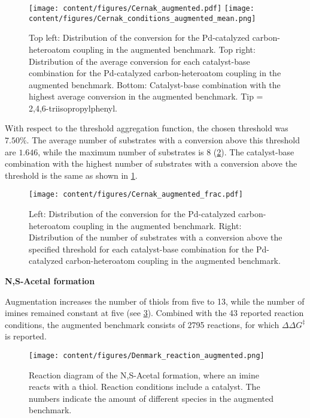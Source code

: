 \begin{figure}[h]
    \centering
    \texttt{[image: content/figures/Cernak\_augmented.pdf]}
    \texttt{[image: content/figures/Cernak\_conditions\_augmented\_mean.png]}
    \caption{Top left: Distribution of the conversion for the Pd-catalyzed carbon-heteroatom coupling in the augmented benchmark. Top right: Distribution of the average conversion for each catalyst-base combination for the Pd-catalyzed carbon-heteroatom coupling in the augmented benchmark. Bottom: Catalyst-base combination with the highest average conversion in the augmented benchmark. Tip = 2,4,6-triisopropylphenyl.}
    \label{fig:Cernak_EDA_augmented}
\end{figure}

With respect to the threshold aggregation function, the chosen threshold was $7.50\%$.
The average number of substrates with a conversion above this threshold are $1.646$, while the maximum number of substrates is $8$ (\cref{fig:Cernak_EDA_frac_augmented}).
The catalyst-base combination with the highest number of substrates with a conversion above the threshold is the same as shown in \cref{fig:Cernak_EDA_augmented}.

\begin{figure}[h]
    \centering
    \texttt{[image: content/figures/Cernak\_augmented\_frac.pdf]}
    \caption{Left: Distribution of the conversion for the Pd-catalyzed carbon-heteroatom coupling in the augmented benchmark. Right: Distribution of the number of substrates with a conversion above the specified threshold for each catalyst-base combination for the Pd-catalyzed carbon-heteroatom coupling in the augmented benchmark.}
    \label{fig:Cernak_EDA_frac_augmented}
\end{figure}
\newpage
\textbf{N,S-Acetal formation}

Augmentation increases the number of thiols from five to 13, while the number of imines remained constant at five (see \cref{fig:Denmark_reaction_augmented}).
Combined with the 43 reported reaction conditions, the augmented benchmark consists of 2795 reactions, for which $\Delta\Delta G^{\ddagger}$ is reported.

\begin{figure}[h]
    \centering
    \texttt{[image: content/figures/Denmark\_reaction\_augmented.png]}
    \caption{Reaction diagram of the N,S-Acetal formation, where an imine reacts with a thiol. Reaction conditions include a catalyst. The numbers indicate the amount of different species in the augmented benchmark.}
    \label{fig:Denmark_reaction_augmented}
\end{figure}

